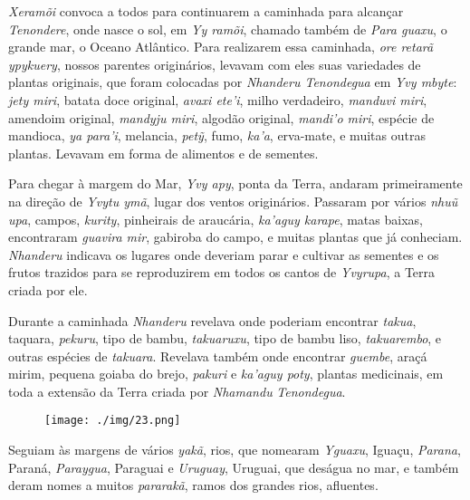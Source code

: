 
 


 

\emph{Xeramõi} convoca a todos para continuarem a caminhada para
alcançar \emph{Tenondere}, onde nasce o sol, em \emph{Yy ramõi}, chamado
também de \emph{Para guaxu}, o grande mar, o Oceano Atlântico. Para
realizarem essa caminhada, \emph{ore retarã ypykuery}, nossos parentes
originários, levavam com eles suas variedades de plantas originais, que
foram colocadas por \emph{Nhanderu Tenondegua} em \emph{Yvy mbyte}:
\emph{jety miri}, batata doce original, \emph{avaxi ete'i}, milho
verdadeiro, \emph{manduvi miri}, amendoim original, \emph{mandyju
miri}, algodão original, \emph{mandi'o miri}, espécie de mandioca,
\emph{ya para'i}, melancia, \emph{petỹ}, fumo, \emph{ka'a}, erva-mate, e
muitas outras plantas. Levavam em forma de alimentos e de sementes.

Para chegar à margem do Mar, \emph{Yvy apy}, ponta da Terra, andaram
primeiramente na direção de \emph{Yvytu ymã}, lugar dos ventos
originários. Passaram por vários \emph{nhuũ upa}, campos, \emph{kurity},
pinheirais de araucária, \emph{ka'aguy karape}, matas baixas,
encontraram \emph{guavira mir}, gabiroba do campo, e muitas plantas que
já conheciam. \emph{Nhanderu} indicava os lugares onde deveriam parar e
cultivar as sementes e os frutos trazidos para se reproduzirem em todos
os cantos de \emph{Yvyrupa}, a Terra criada por ele.

Durante a caminhada \emph{Nhanderu} revelava onde poderiam encontrar
\emph{takua}, taquara, \emph{pekuru}, tipo de bambu, \emph{takuaruxu},
tipo de bambu liso, \emph{takuarembo}, e outras espécies de
\emph{takuara}. Revelava também onde encontrar \emph{guembe}, araçá
mirim, pequena goiaba do brejo, \emph{pakuri} e \emph{ka'aguy poty},
plantas medicinais, em toda a extensão da Terra criada por
\emph{Nhamandu} \emph{Tenondegua}.



\begin{figure}[p]
\texttt{[image: ./img/23.png]}
\end{figure}
 

Seguiam às margens de vários \emph{yakã}, rios, que nomearam
\emph{Yguaxu}, Iguaçu, \emph{Parana}, Paraná, \emph{Paraygua}, Paraguai
e \emph{Uruguay}, Uruguai, que deságua no mar, e também deram nomes a
muitos \emph{pararakã}, ramos dos grandes rios, afluentes.

